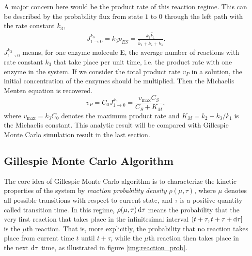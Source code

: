 		A major concern here would be the product rate of this reaction regime. This can be described by the probability flux from state $1$ to $0$ through the left path with the rate constant $k_3$,
		\begin{equation}
			\begin{aligned}
				J_{1\rightarrow0}^{k_3} = k_3 p_{ES} 
					= \frac{k_3 \widetilde{k_1}}{\widetilde{k_1}+k_2+k_3} . 
			\end{aligned}
		\end{equation}
		$J_{1\rightarrow0}^{k_3}$ means, for one enzyme molecule E, the average number of reactions with rate constant $k_3$ that take place per unit time, i.e. the product rate with one enzyme in the system. If we consider the total product rate $v_P$ in a solution, the initial concentration of the enzymes should be multiplied. Then the Michaelis Menten equation \cite{michaelis1913} is recovered.
		\begin{equation}
				v_P = C_0 J_{1\rightarrow0}^{k_3} = \frac{v_{\text{max}} C_S}{C_S + K_M},
				\label{eq:MM}
		\end{equation}
		where $v_{\text{max}}=k_3C_0$ denotes the maximum product rate and $K_M=k_2+k_3/k_1$ is the Michaelis constant. This analytic result will be compared with Gillespie Monte Carlo simulation result in the last section.

	\subsection{Gillespie Monte Carlo Algorithm}

		The core idea of Gillespie Monte Carlo algorithm \cite{gillespie1976,gillespie1977} is to characterize the kinetic properties of the system by \textit{reaction probability density} $\rho(\mu,\tau)$, where $\mu$ denotes all possible transitions with respect to current state, and $\tau$ is a positive quantity called transition time. In this regime, $\rho(\mu,\tau)\operatorname{d\!} \tau$ means the probability that the very first reaction that takes place in the infinitesimal interval $(t+\tau, t+\tau + \operatorname{d\!} \tau]$ is the $\mu$th reaction. That is, more explicitly, the probability that no reaction takes place from current time $t$ until $t+\tau$, while the $\mu$th reaction then takes place in the next $\operatorname{d\!} \tau$ time, as illustrated in figure \ref{img:reaction_prob}.

